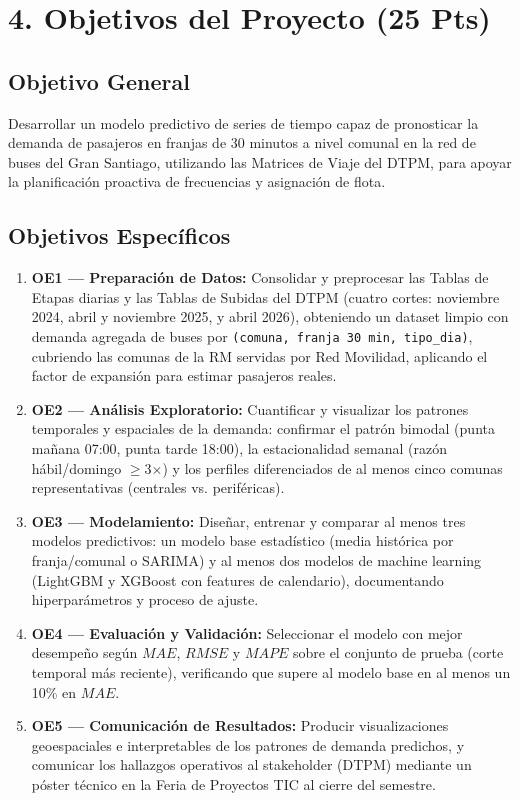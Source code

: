 \documentclass[11pt,letterpaper]{article}
\begin{document}
\section*{\color{primary}4. Objetivos del Proyecto (25 Pts)}

\subsection*{Objetivo General}
Desarrollar un modelo predictivo de series de tiempo capaz de pronosticar la demanda de pasajeros en franjas de 30 minutos a nivel comunal en la red de buses del Gran Santiago, utilizando las Matrices de Viaje del DTPM, para apoyar la planificación proactiva de frecuencias y asignación de flota.

\subsection*{Objetivos Específicos}
\begin{enumerate}
    \item \textbf{OE1 — Preparación de Datos:} Consolidar y preprocesar las Tablas de Etapas diarias y las Tablas de Subidas del DTPM (cuatro cortes: noviembre 2024, abril y noviembre 2025, y abril 2026), obteniendo un dataset limpio con demanda agregada de buses por \texttt{(comuna, franja 30 min, tipo\_dia)}, cubriendo las comunas de la RM servidas por Red Movilidad, aplicando el factor de expansión para estimar pasajeros reales.
    \item \textbf{OE2 — Análisis Exploratorio:} Cuantificar y visualizar los patrones temporales y espaciales de la demanda: confirmar el patrón bimodal (punta mañana 07:00, punta tarde 18:00), la estacionalidad semanal (razón hábil/domingo $\geq$3$\times$) y los perfiles diferenciados de al menos cinco comunas representativas (centrales vs. periféricas).
    \item \textbf{OE3 — Modelamiento:} Diseñar, entrenar y comparar al menos tres modelos predictivos: un modelo base estadístico (media histórica por franja/comunal o SARIMA) y al menos dos modelos de machine learning (LightGBM y XGBoost con features de calendario), documentando hiperparámetros y proceso de ajuste.
    \item \textbf{OE4 — Evaluación y Validación:} Seleccionar el modelo con mejor desempeño según $MAE$, $RMSE$ y $MAPE$ sobre el conjunto de prueba (corte temporal más reciente), verificando que supere al modelo base en al menos un 10\% en $MAE$.
    \item \textbf{OE5 — Comunicación de Resultados:} Producir visualizaciones geoespaciales e interpretables de los patrones de demanda predichos, y comunicar los hallazgos operativos al stakeholder (DTPM) mediante un póster técnico en la Feria de Proyectos TIC al cierre del semestre.
\end{enumerate}
\end{document}
